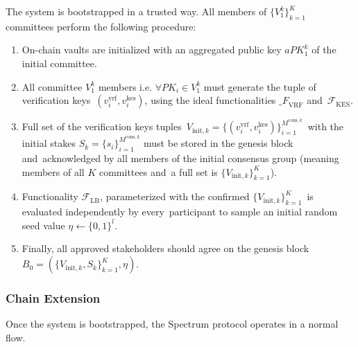 The system is bootstrapped in a trusted way.
All members of $\{V^k_1\}_{k=1}^K$ committees perform the following procedure:
\begin{enumerate}
    \item On-chain vaults are initialized with an aggregated public key $aPK^k_1$ of the initial committee.

    \item All committee $V^k_1$ members i.e. ${\forall PK_i \in V^k_1}$ must generate the tuple of verification keys\
    ${(v_i^{\text{vrf}}, v_i^{\text{kes}})}$, using the ideal functionalities ${\mathcal_{F}}_{\text{VRF}}$ and\
    ${\mathcal{F}}_{\text{KES}}$.

    \item Full set of the verification keys tuples\
    ${V_{\text{init}, k} = \{(v_i^{\text{vrf}}, v_i^{\text{kes}})\}_{i=1}^{M^{\text{cons}, k}}}$\
    with the initial stakes $S_k = \{s_i\}_{i=1}^{M^{\text{cons}, k}}$ must be stored in the genesis block and\
    acknowledged by all members of the initial consensus group (meaning members of all $K$ committees and\
    a full set is $\{V_{\text{init}, k}\}_{k=1}^{K}$).

    \item Functionality ${\mathcal{F}}_{\text{LB}}$, parameterized with the confirmed $\{V_{\text{init}, k}\}_{k=1}^{K}$\
    is evaluated independently by every\
    participant to sample an initial random seed value $\eta \leftarrow \{0, 1\}^l$.

    \item Finally, all approved stakeholders should agree on the genesis block\
    ${B_0=\left(\{V_{\text{init}, k}, S_k\}_{k=1}^{K}, \eta\right)}$.
\end{enumerate}

\subsubsection{Chain Extension}\label{subsubsec:chain-extension}
Once the system is bootstrapped, the Spectrum protocol operates in a normal flow.

